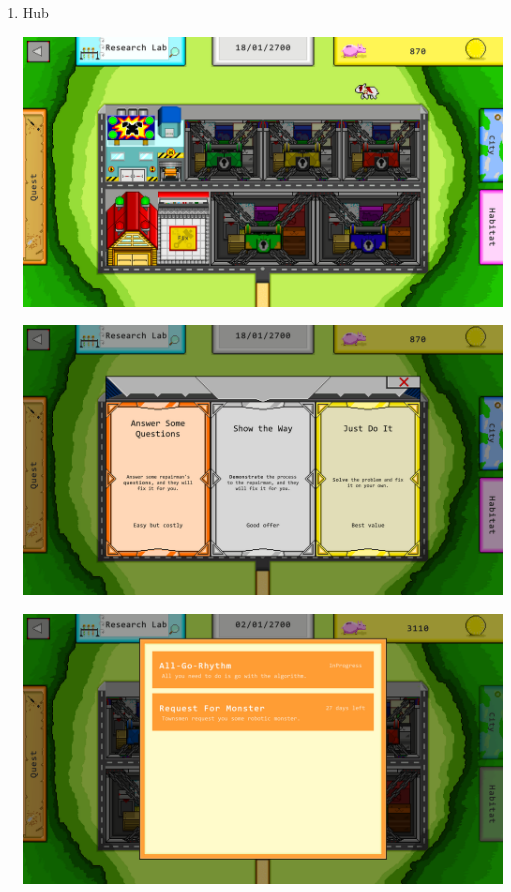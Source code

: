 \documentclass[12pt,oneside,openright,a4paper]{cpe-english-project}
\begin{document}
\begin{enumerate}
	\item Hub \\
	\begin{minipage}[c]{\textwidth}\centering
	\includegraphics[width=14cm]{figure/screenshot/screenshot-hub-main.png}
	\end{minipage}
	\begin{minipage}[c]{\textwidth}\centering
	\includegraphics[width=14cm]{figure/screenshot/screenshot-hub-fix.png}
	\end{minipage}
	\begin{minipage}[c]{\textwidth}\centering
	\includegraphics[width=14cm]{figure/screenshot/screenshot-hub-quest.png}

\end{minipage}
\end{enumerate}
\end{document}
